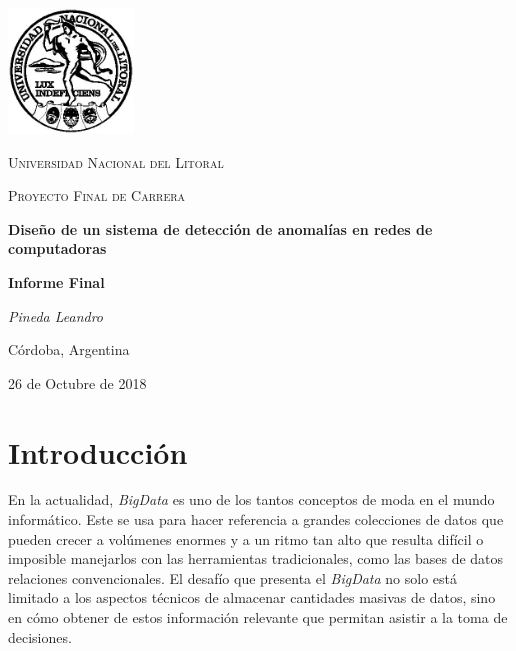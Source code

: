 \documentclass[a4paper,12pt, oneside]{article}
\begin{document}
	
\begin{titlepage}
	\centering
	\includegraphics[width=0.25\textwidth]{../Universidad_del_Litoral}\par\vspace{1cm}
	{\scshape\LARGE Universidad Nacional del Litoral \par}
	\vspace{1cm}
	{\scshape\Large Proyecto Final de Carrera\par}
	\vspace{1.5cm}
	{\huge\bfseries Diseño de un sistema de detección de anomalías en redes de computadoras\par}
	\vspace{4cm}
	{\huge\bfseries Informe Final\par}
	\vfill
	
	{\Large \itshape Pineda Leandro\par}
	
	
	\large Córdoba, Argentina\par
	{\large 26 de Octubre de 2018 \par}	
\end{titlepage}


\clearpage\mbox{}

\thispagestyle{empty}

\clearpage
\tableofcontents

\newpage

\section{Introducción}
En la actualidad, \textit{BigData} es uno de los tantos conceptos de moda en el mundo informático. Este se usa para hacer referencia a grandes colecciones de datos que pueden crecer a volúmenes enormes y a un ritmo tan alto que resulta difícil o imposible manejarlos con las herramientas tradicionales, como las bases de datos relaciones convencionales. El desafío que presenta el \textit{BigData} no solo está limitado a los aspectos técnicos de almacenar cantidades masivas de datos, sino en cómo obtener de estos información relevante que permitan asistir a la toma de decisiones.
\end{document}
